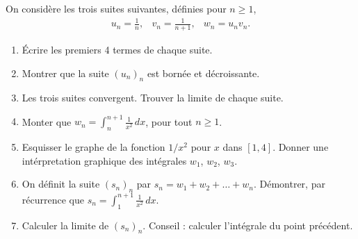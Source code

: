 
\begin{exercice}\label{exoExamenDecembre2010-0003}

On considère les trois suites suivantes, définies pour $n\geq 1$, 
\begin{equation}\nonumber
  \begin{array}{ccc}
   \displaystyle  u_n=\frac{1}{n}, &\displaystyle  v_n=\frac{1}{n+1}, & \displaystyle w_n=u_nv_n.
  \end{array}
\end{equation}
\begin{enumerate}
\item Écrire les premiers 4 termes de chaque suite.
\item Montrer que la suite $(u_n)_n$ est bornée et décroissante.  
\item Les trois suites convergent. Trouver la limite de chaque suite.
\item Monter que $\displaystyle w_n=\int_{n}^{n+1}\frac{1}{x^2}\, dx$, pour tout $n\geq 1$.
\item Esquisser le graphe de la fonction $1/x^2$ pour $x$ dans $[1,4]$. Donner une intérpretation graphique des intégrales  $w_1$, $w_2$, $w_3$. 
\item On définit la suite $(s_n)_n$ par $s_n= w_1+w_2+\ldots+ w_n$. Démontrer, par récurrence que $s_n=\int_{1}^{n+1}\frac{1}{x^2}\,dx$.
\item Calculer la limite de $(s_n)_n$. Conseil : calculer l'intégrale du point précédent.  
\end{enumerate}

\end{exercice}
